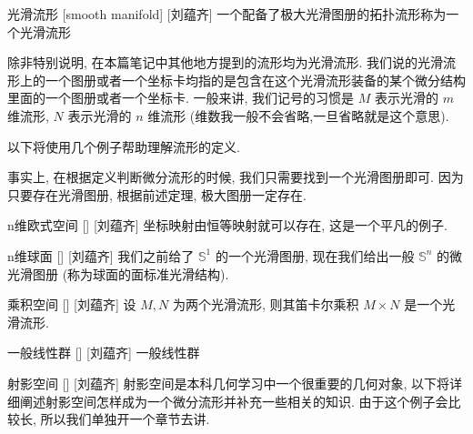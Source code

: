 \documentclass[UTF8]{ctexart}
\begin{document}
        \begin{dfn}
            []
            {光滑流形}
            [smooth manifold]
            [刘蕴齐]
            一个配备了极大光滑图册的拓扑流形称为一个光滑流形
        \end{dfn}
        
        \begin{rmk}
            []
            除非特别说明, 在本篇笔记中其他地方提到的流形均为光滑流形. 我们说的光滑流形上的一个图册或者一个坐标卡均指的是包含在这个光滑流形装备的某个微分结构里面的一个图册或者一个坐标卡. 一般来讲, 我们记号的习惯是 \(M\) 表示光滑的 \(m\) 维流形,  \(N\) 表示光滑的 \(n\) 维流形 (维数我一般不会省略,一旦省略就是这个意思). 
        \end{rmk}
        
        以下将使用几个例子帮助理解流形的定义. 
        
        \begin{rmk}
            []
            事实上, 在根据定义判断微分流形的时候, 我们只需要找到一个光滑图册即可. 因为只要存在光滑图册, 根据前述定理, 极大图册一定存在. 
        \end{rmk}
        
        \begin{xmp}
            []
            {n维欧式空间}
            []
            [刘蕴齐]
            坐标映射由恒等映射就可以存在, 这是一个平凡的例子. 
        \end{xmp}
        
        \begin{xmp}
            []
            {n维球面}
            []
            [刘蕴齐]
            我们之前给了 \(\mathbb{S}^1\) 的一个光滑图册, 现在我们给出一般 \(\mathbb{S}^n\) 的微光滑图册 (称为球面的面标准光滑结构). 
        \end{xmp}

        \begin{xmp}
            []
            {乘积空间}
            []
            [刘蕴齐]
            设 \(M,N\) 为两个光滑流形, 则其笛卡尔乘积 \( M\times N\) 是一个光滑流形. 
        \end{xmp}

        \begin{xmp}
            []
            {一般线性群}
            []
            [刘蕴齐]
            一般线性群
        \end{xmp}
        
        \begin{xmp}
            []
            {射影空间}
            []
            [刘蕴齐]
            射影空间是本科几何学习中一个很重要的几何对象, 以下将详细阐述射影空间怎样成为一个微分流形并补充一些相关的知识. 由于这个例子会比较长, 所以我们单独开一个章节去讲. 
        \end{xmp}
\end{document}
